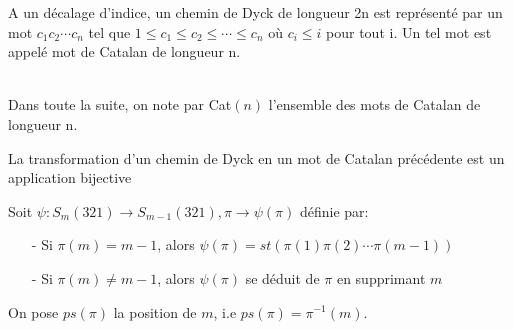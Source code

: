 \begin{definition}
	\begin{rm}
		A un décalage d'indice, un chemin de Dyck de longueur 2n est représenté par un mot $c_{1}c_{2}
			\cdots c_{n}$ tel que $1 \leq c_{1} \leq c_{2} \leq \cdots \leq c_{n}$ où $c_{i} \leq i$ pour
		tout i. Un tel mot est appelé mot de Catalan de longueur n.
	\end{rm}
\end{definition}
\newpage
\text{}\\
Dans toute la suite, on note par \rm{Cat}$(n)$ l'ensemble des mots de Catalan  de longueur n.
\begin{lemme}
	La transformation d'un chemin de \rm{Dyck} en un mot de \rm{Catalan} précédente est un application bijective
\end{lemme}


\begin{definition} \label{psiDef_}
	\begin{rm}
		Soit $\psi: S_{m}(321)\longrightarrow S_{m-1}(321), \pi \longrightarrow \psi(\pi)$ définie par:
		\begin{itemize}
			\item [-] Si $\pi(m)=m-1$, alors $\psi(\pi)=st(\pi(1)\pi(2)\cdots \pi(m-1))$
			\item [-] Si $\pi(m)\neq m-1$, alors $\psi(\pi)$ se déduit de $\pi$ en supprimant $m$
		\end{itemize}
		On pose $ps(\pi)$ la position de $m$, i.e $ps(\pi)=\pi^{-1}(m)$.
	\end{rm}
\end{definition}

